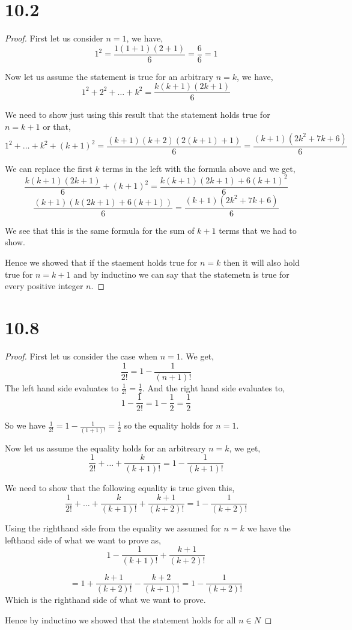 \documentclass[a4paper]{report}
\begin{document}
\section*{10.2}
\begin{proof}
    First let us consider $n = 1$, we have, 
    $$ 1^2 = \frac{1 ( 1 + 1) (2 + 1)}{6}  = \frac{6}{6}=1$$ 

    Now let us assume the statement is true for an arbitrary $n = k$, we have, 
    $$ 1^2 + 2^2 + \dots + k^2 = \frac{k(k + 1)(2k + 1)}{6} $$ 

    We need to show just using this result that the statement holds true for $n = k + 1$ or that,  
    $$ 1^2 + \dots + k^2 + (k +1)^2 = \frac{(k + 1)(k + 2)(2(k + 1) + 1)}{6} = \frac{(k + 1)(2k^2 + 7k + 6)}{6}$$ 

    We can replace the first $k$ terms in the left with the formula above and we get, 
    $$\frac{k(k + 1)(2k + 1)}{6} + (k + 1)^2   = \frac{k(k + 1)(2k + 1) + 6(k+1)^2}{6}$$
    $$ \frac{(k + 1)(k(2k + 1) + 6(k + 1))}{6} = \frac{(k + 1)(2k^2 + 7k + 6)}{6}$$ 

    We see that this is the same formula for the sum of $k + 1$ terms that we had to show.

    Hence we showed that if the staement holds true for  $n = k$ then it will also hold true for  $n = k + 1$ and by inductino we can say that the statemetn is true for every positive integer $n$.


\end{proof}

\section*{10.8}
\begin{proof}
    First let us consider the case when $n = 1$. We get,  
    $$ \frac{1}{2!} = 1 - \frac{1}{(n + 1)!} $$ 
    The left hand side evaluates to $ \frac{1}{2!} = \frac{1}{2}$. And the right hand side evaluates to, 
    $$ 1 - \frac{1}{2!} = 1 - \frac{1}{2} = \frac{1}{2} $$ 

    So we have $\frac{1}{2!} = 1 - \frac{1}{(1 + 1)!} = \frac{1}{2}$ so the equality holds for $n = 1$.

    Now let us assume the equality holds for an arbitreary  $n = k$, we get, 
    $$ \frac{1}{2!} + \dots + \frac{k}{(k + 1)!}  = 1 - \frac{1}{(k + 1)!}$$ 

    We need to show that the following equality is true given this, 
    $$ \frac{1}{2!} + \dots + \frac{k}{(k + 1)!} + \frac{k + 1}{(k + 2)!}  = 1 - \frac{1}{(k + 2)!}$$ 


    Using the righthand side from the equality we assumed for $n = k$ we have the lefthand side of what we want to prove as,  
    $$   1 - \frac{1}{(k + 1)!} + \frac{k + 1}{(k + 2)!} $$
    
    $$ = 1 + \frac{k + 1}{(k + 2)!} - \frac{k + 2}{(k + 1)!} = 1 - \frac{1}{(k + 2)!} $$ 
    Which is the righthand side of what we want to prove. 

    Hence by inductino we showed that the statement holds for all $n \in N$

\end{proof}
\end{document}

